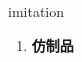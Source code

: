 
\begin{frame}
{\huge imitation}
\begin{center}
\begin{enumerate}\Large
  \item \textbf{仿制品}
\end{enumerate}
\end{center}
\end{frame}
